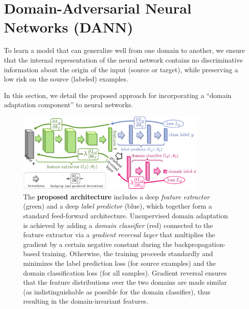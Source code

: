 \section{Domain-Adversarial Neural Networks (DANN)}
\label{section:dann}

To learn a
model that can generalize well from one domain to another, we ensure that
the internal representation of the neural network contains no discriminative information about the origin of the input (source or target), while preserving a low risk on the source (labeled) examples.

In this section, we detail the proposed approach for incorporating a ``domain adaptation component'' to neural networks.




 \begin{figure}[t]
 \centering
 \includegraphics[width=0.85\textwidth]{Chapters/gradrev/figures/deepDA2_c.pdf}
 \caption{The {\bf proposed architecture} includes a deep {\em feature extractor} (green) and a deep {\em label predictor} (blue), which together form a standard feed-forward architecture. Unsupervised domain adaptation is achieved by adding a {\em domain classifier} (red) connected to the feature extractor via a {\em gradient reversal layer} that multiplies the gradient by a certain negative constant during the backpropagation-based training. Otherwise, the training proceeds standardly and minimizes the label prediction loss (for source examples) and the domain classification loss (for all samples). Gradient reversal ensures that the feature distributions over the two domains are made similar (as indistinguishable as possible for the domain classifier), thus resulting in the domain-invariant features.\vspace{-2mm}}
 \label{fig:arch}
 \end{figure}
 

